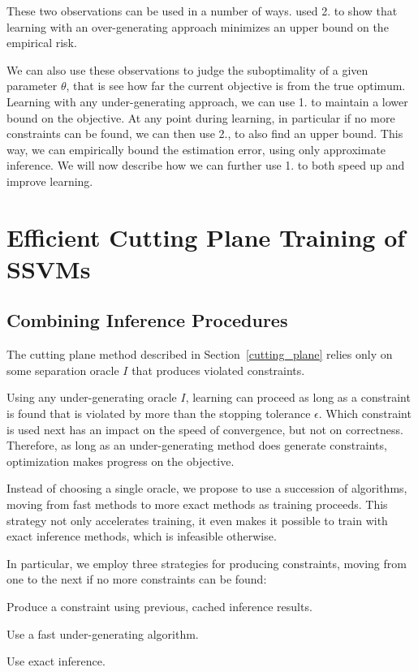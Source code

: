 These two observations can be used in a number of ways.
\citet{finley2008training} used 2. to show that learning with an
over-generating approach minimizes an upper bound on the empirical risk.

We can also use these observations to judge the suboptimality of a given parameter $\theta$,
that is see how far the current objective is from the true optimum.
Learning with any under-generating approach, we can use 1. to maintain a lower bound
on the objective. At any point during learning, in particular if no more constraints
can be found, we can then use 2., to also find an upper bound.
This way, we can empirically bound the estimation error, using only approximate
inference.
We will now describe how we can further use 1. to both speed up and improve learning.


\section{Efficient Cutting Plane Training of SSVMs}\label{learning}

\subsection{Combining Inference Procedures}\label{combining}
The cutting plane method described in Section~\ref{cutting_plane} relies only
on some separation oracle $I$ that produces violated constraints.

Using any under-generating oracle $I$, learning can proceed as long as a
constraint is found that is violated by more than the stopping tolerance
$\epsilon$.  Which constraint is used next has an impact on the speed of
convergence, but not on correctness. Therefore, as long as an under-generating
method does generate constraints, optimization makes progress on the objective.

Instead of choosing a single oracle, we propose to use a succession of
algorithms, moving from fast methods to more exact methods as training
proceeds. This strategy not only accelerates training, it even makes it
possible to train with exact inference methods, which is infeasible otherwise.

In particular, we employ three strategies for producing constraints,
moving from one to the next if no more constraints can be found:
\begin{enumerate*}
    \item Produce a constraint using previous, cached inference results.
    \item Use a fast under-generating algorithm.
    \item Use exact inference.
\end{enumerate*}

